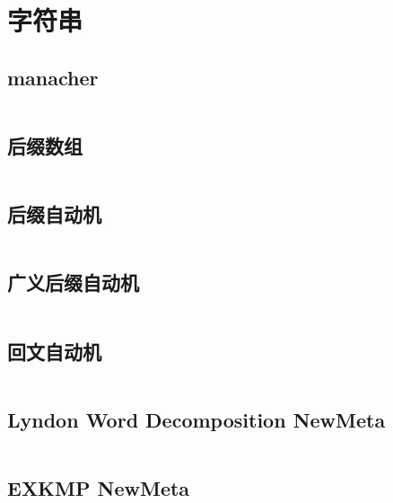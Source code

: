\section{字符串}
\subsection{manacher}
\inputminted[breaklines]{cpp}{./string/manacher.cpp}
\subsection{后缀数组}
\inputminted[breaklines]{cpp}{./string/SA.cpp}
\subsection{后缀自动机}
\inputminted[breaklines]{cpp}{./string/SAM.cpp}
\subsection{广义后缀自动机}
\inputminted[breaklines]{cpp}{./string/general_SAM.cpp}
\subsection{回文自动机}
\inputminted[breaklines]{cpp}{./string/pam.cpp}
\subsection{Lyndon Word Decomposition  NewMeta}
\inputminted[breaklines]{cpp}{./string/Lyndon_Word_Decomposition-NewMeta.cpp}
\subsection{EXKMP  NewMeta}
\inputminted[breaklines]{cpp}{./string/EXKMP-NewMeta.cpp}